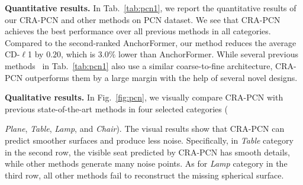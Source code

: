 \documentclass[letterpaper]{article} %
\begin{document}
{\bf Quantitative results.} 
In Tab.~\ref{tab:pcn1}, we report the quantitative results of our CRA-PCN and other methods on PCN dataset. 
We see that CRA-PCN achieves the best performance over all previous methods in all categories. 
Compared to the second-ranked AnchorFormer, our method reduces the average CD-$\ell$1 by $0.20$, which is $3.0\%$ lower than AnchorFormer. 
While several previous methods~\cite{xiang2021snowflakenet, zhou2022seedformer,yan2022fbnet} in Tab.~\ref{tab:pcn1} also use a similar coarse-to-fine architecture, CRA-PCN outperforms them by a large margin with the help of several novel designs.

{ \bf Qualitative results.} 
In Fig.~\ref{fig:pcn}, we visually compare CRA-PCN with previous state-of-the-art methods in four selected categories ({{\em Plane}, {\em Table}, {\em Lamp}, and {\em Chair}).
 The visual results show that CRA-PCN can predict smoother surfaces and produce less noise. 
Specifically, in \textit{Table} category in the second row, the visible seat predicted by CRA-PCN has  smooth details, while other methods generate many noise points. 
 As for \textit{Lamp} category in the third row, all other methods fail to reconstruct the missing spherical surface.

\begin{table}[!t]
\begin{center}
\end{center}
\caption{Results on ShapeNet-34 in terms of  L2 Chamfer Distance $\times$ $10^3$ (lower is better). } \label{tab:shapenet34}
\end{table}

}
\end{document}
